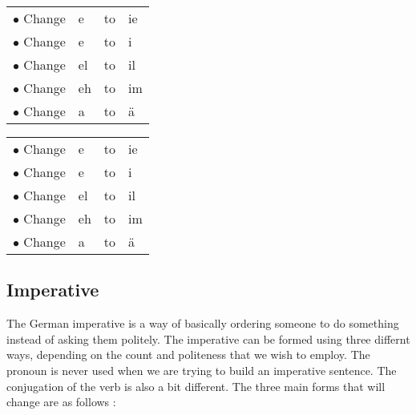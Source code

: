 \documentclass[a4paper,twocolumn,10pt]{article}
\newcommand{\newpar}
{\par \vspace{0.3cm}}
\begin{document}

\vspace{0.3cm}
\begin{tabular}{l l l l}

\rowcolor{white} $\bullet$ Change & e  & to & ie\\
\rowcolor{white} $\bullet$ Change & e  & to & i\\
\rowcolor{white} $\bullet$ Change & el & to & il\\
\rowcolor{white} $\bullet$ Change & eh & to & im\\
\rowcolor{white} $\bullet$ Change & a  & to & ä\\

\end{tabular}
\vspace{0.3cm}
\newline


\vspace{0.3cm}
\begin{tabular}{l l l l}

\rowcolor{white} $\bullet$ Change & e  & to & ie\\
\rowcolor{white} $\bullet$ Change & e  & to & i\\
\rowcolor{white} $\bullet$ Change & el & to & il\\
\rowcolor{white} $\bullet$ Change & eh & to & im\\
\rowcolor{white} $\bullet$ Change & a  & to & ä\\

\end{tabular}
\vspace{0.3cm}
\newline


\subsection{Imperative}
\label{ssec:imperative}

The German imperative is a way of basically ordering someone to do something
instead of asking them politely. The imperative can be formed using three
differnt ways, depending on the count and politeness that we wish to employ. The
pronoun is never used when we are trying to build an imperative sentence. The
conjugation of the verb is also a bit different. The three main forms that will
change are as follows :\newpar
\end{document}
